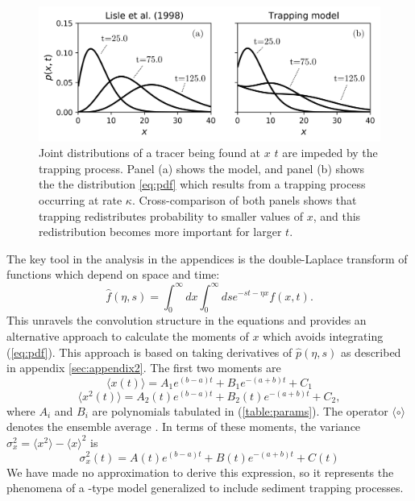 \documentclass[]{agujournal2018}
\newcommand\be{\begin{equation}}
\newcommand\ee{\end{equation}}
\newcommand\bra{\langle}
\newcommand\ket{\rangle}
\begin{document}
\begin{figure}
	\includegraphics[width=\linewidth,keepaspectratio]{./figures/pdf-plot-edit.png}
	\caption{Joint distributions of a tracer being found at $x$ $t$ are impeded by the trapping process. Panel (a) shows the \citet{Lisle1998} model, and panel (b) shows the the distribution \ref{eq:pdf} which results from a trapping process occurring at rate $\kappa$. Cross-comparison of both panels shows that trapping redistributes probability to smaller values of $x$, and this redistribution becomes more important for larger $t$.}
	\label{fig:pdfs}
\end{figure}
The key tool in the analysis in the appendices is the double-Laplace transform of functions which depend on space and time:
\be \hat{f}(\eta,s) = \int_0^\infty dx \int_0^\infty ds e^{-st-\eta x}f(x,t).\ee
This unravels the convolution structure in the equations and provides an alternative approach to calculate the moments of $x$ which avoids integrating (\ref{eq:pdf}).
This approach is based on taking derivatives of $\hat{p}(\eta,s)$ as described in appendix \ref{sec:appendix2}.
The first two moments are
\be \bra x(t) \ket = A_1 e^{(b-a)t}+B_1e^{-(a+b)t}+C_1 \label{eq:mean}\ee
\be \bra x^2(t) \ket = A_2(t)e^{(b-a)t}+B_2(t)e^{-(a+b)t}+C_2, \label{eq:second}\ee
where $A_i$ and $B_i$ are polynomials tabulated in (\ref{table:params}).
The operator $\bra \circ \ket$ denotes the ensemble average \citep[e.g.][]{Kittel1958}.
In terms of these moments, the variance $\sigma_x^2 = \bra x^2\ket - \bra x \ket^2$ is
\be \sigma_x^2(t) = A(t)e^{(b-a)t} + B(t)e^{-(a+b)t} + C(t) \label{eq:var}\ee
We have made no approximation to derive this expression, so it represents the phenomena of a \citet{Lisle1998}-type model generalized to include sediment trapping processes.
\end{document}
